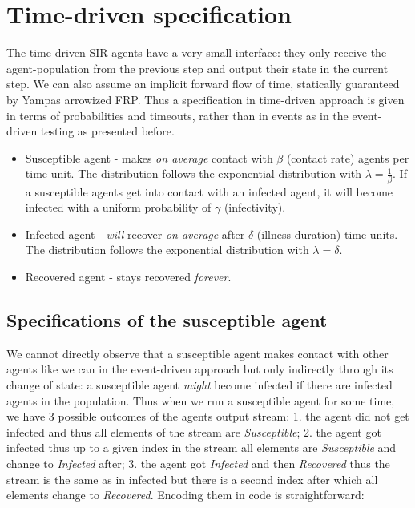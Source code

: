 \section{Time-driven specification}
\label{sec:timedriven_specification}
The time-driven SIR agents have a very small interface: they only receive the agent-population from the previous step and output their state in the current step. We can also assume an implicit forward flow of time, statically guaranteed by Yampas arrowized FRP. Thus a specification in time-driven approach is given in terms of probabilities and timeouts, rather than in events as in the event-driven testing as presented before.

\begin{itemize}
	\item Susceptible agent - makes \textit{on average} contact with $\beta$ (contact rate) agents per time-unit. The distribution follows the exponential distribution with $\lambda = \frac{1}{\beta}$. If a susceptible agents get into contact with an infected agent, it will become infected with a uniform probability of $\gamma$ (infectivity).
	
	\item Infected agent - \textit{will} recover \textit{on average} after $\delta$ (illness duration) time units. The distribution follows the exponential distribution with $\lambda = \delta$.

	\item Recovered agent - stays recovered \textit{forever}.
\end{itemize}

\subsection{Specifications of the susceptible agent}
We cannot directly observe that a susceptible agent makes contact with other agents like we can in the event-driven approach but only indirectly through its change of state: a susceptible agent \textit{might} become infected if there are infected agents in the population.
Thus when we run a susceptible agent for some time, we have 3 possible outcomes of the agents output stream: 1. the agent did not get infected and thus all elements of the stream are \textit{Susceptible}; 2. the agent got infected thus up to a given index in the stream all elements are \textit{Susceptible} and change to \textit{Infected} after; 3. the agent got \textit{Infected} and then \textit{Recovered} thus the stream is the same as in infected but there is a second index after which all elements change to \textit{Recovered}. Encoding them in code is straightforward:

